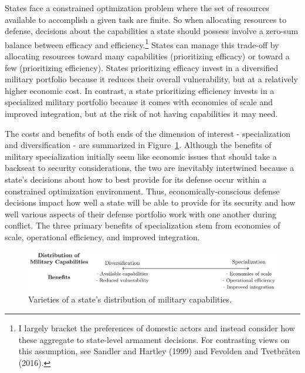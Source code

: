 \documentclass[
  12,
  letterpaper,
  DIV=11,
  numbers=noendperiod]{scrartcl}
\begin{document}
States face a constrained optimization problem where the set of
resources available to accomplish a given task are finite. So when
allocating resources to defense, decisions about the capabilities a
state should possess involve a zero-sum balance between efficacy and
efficiency.\footnote{I largely bracket the preferences of domestic
  actors and instead consider how these aggregate to state-level
  armament decisions. For contrasting views on this assumption, see
  Sandler and Hartley (1999) and Fevolden and Tvetbråten (2016).} States
can manage this trade-off by allocating resources toward many
capabilities (prioritizing efficacy) or toward a few (prioritizing
efficiency). States prioritizing efficacy invest in a diversified
military portfolio because it reduces their overall vulnerability, but
at a relatively higher economic cost. In contrast, a state prioritizing
efficiency invests in a specialized military portfolio because it comes
with economies of scale and improved integration, but at the risk of not
having capabilities it may need.

The costs and benefits of both ends of the dimension of interest -
specialization and diversification - are summarized in
Figure~\ref{fig-spectrum_specialization}. Although the benefits of
military specialization initially seem like economic issues that should
take a backseat to security considerations, the two are inevitably
intertwined because a state's decisions about how to best provide for
its defense occur within a constrained optimization environment. Thus,
economically-conscious defense decisions impact how well a state will be
able to provide for its security and how well various aspects of their
defense portfolio work with one another during conflict. The three
primary benefits of specialization stem from economies of scale,
operational efficiency, and improved integration.

\begin{figure}

{\centering \includegraphics{2023-04-04_Specialization_files/figure-pdf/fig-spectrum_specialization-1.png}

}

\caption{\label{fig-spectrum_specialization}Varieties of a state's
distribution of military capabilities.}

\end{figure}
\end{document}
